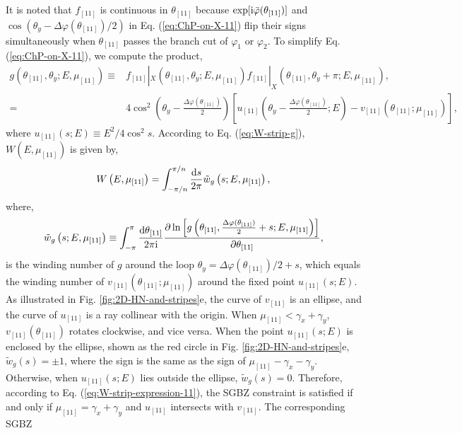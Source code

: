 It is noted that $f_{[11]}$ is continuous in $\theta_{[11]}$ because
$\exp[\mathrm{i}\bar{\varphi}(\theta_{[11]})]$ and $\cos(\theta_{y}-\Delta\varphi(\theta_{[11]})/2)$
in Eq. (\ref{eq:ChP-on-X-11}) flip their signs simultaneously when
$\theta_{[11]}$ passes the branch cut of $\varphi_{1}$ or $\varphi_{2}$.
To simplify Eq. (\ref{eq:ChP-on-X-11}), we compute the product, 
\begin{align}
g\left(\theta_{[11]},\theta_{y};E,\mu_{[11]}\right)\equiv & f_{[11]}|_{X}\left(\theta_{[11]},\theta_{y};E,\mu_{[11]}\right)f_{[11]}|_{X}\left(\theta_{[11]},\theta_{y}+\pi;E,\mu_{[11]}\right),\nonumber \\
= & 4\cos^{2}\left(\theta_{y}-\frac{\Delta\varphi(\theta_{[11]})}{2}\right)\left[u_{[11]}\left(\theta_{y}-\frac{\Delta\varphi(\theta_{[11]})}{2};E\right)-v_{[11]}\left(\theta_{[11]};\mu_{[11]}\right)\right],
\end{align}
where $u_{[11]}\left(s;E\right)\equiv E^{2}/4\cos^{2}s$. According
to Eq. (\ref{eq:W-strip-g}), $W(E,\mu_{[11]})$ is given by, 
\begin{equation}
W\left(E,\mu_{[11]}\right)=\int_{-\pi/n}^{\pi/n}\frac{\mathrm{d} s}{2\pi}\tilde{w}_{g}\left(s;E,\mu_{[11]}\right),\label{eq:W-strip-expression-11}
\end{equation}
where, 
\begin{equation}
\tilde{w}_{g}\left(s;E,\mu_{[11]}\right)\equiv\int_{-\pi}^{\pi}\frac{\mathrm{d}\theta_{[11]}}{2\pi\mathrm{i}}\frac{\partial\ln\left[g\left(\theta_{[11]},\frac{\Delta\varphi(\theta_{[11]})}{2}+s;E,\mu_{[11]}\right)\right]}{\partial\theta_{[11]}},
\end{equation}
is the winding number of $g$ around the loop $\theta_{y}=\Delta\varphi(\theta_{[11]})/2+s$,
which equals the winding number of $v_{[11]}(\theta_{[11]};\mu_{[11]})$
around the fixed point $u_{[11]}(s;E)$. As illustrated in Fig. \ref{fig:2D-HN-and-stripes}e,
the curve of $v_{[11]}$ is an ellipse, and the curve of $u_{[11]}$
is a ray collinear with the origin. When $\mu_{[11]}<\gamma_{x}+\gamma_{y}$,
$v_{[11]}(\theta_{[11]})$ rotates clockwise, and vice versa. When
the point $u_{[11]}(s;E)$ is enclosed by the ellipse, shown as the
red circle in Fig. \ref{fig:2D-HN-and-stripes}e, $\tilde{w}_{g}(s)=\pm1$,
where the sign is the same as the sign of $\mu_{[11]}-\gamma_{x}-\gamma_{y}$.
Otherwise, when $u_{[11]}(s;E)$ lies outside the ellipse, $\tilde{w}_{g}(s)=0$.
Therefore, according to Eq. (\ref{eq:W-strip-expression-11}), the
SGBZ constraint is satisfied if and only if $\mu_{[11]}=\gamma_{x}+\gamma_{y}$
and $u_{[11]}$ intersects with $v_{[11]}$. The corresponding SGBZ
